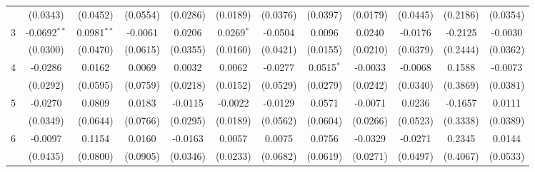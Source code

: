 \begin{adjustbox}{width=650}
\begin{tabular}{lccccccccccc}
                                            & (0.0343)        & (0.0452)             & (0.0554)                   & (0.0286)      & (0.0189)                      & (0.0376)                    & (0.0397)              & (0.0179)         & (0.0445)       & (0.2186)  & (0.0354)\\   
    3     & -0.0692$^{**}$  & 0.0981$^{**}$        & -0.0061                    & 0.0206        & 0.0269$^{*}$                  & -0.0504                     & 0.0096                & 0.0240           & -0.0176        & -0.2125   & -0.0030\\   
                                            & (0.0300)        & (0.0470)             & (0.0615)                   & (0.0355)      & (0.0160)                      & (0.0421)                    & (0.0155)              & (0.0210)         & (0.0379)       & (0.2444)  & (0.0362)\\   
    4     & -0.0286         & 0.0162               & 0.0069                     & 0.0032        & 0.0062                        & -0.0277                     & 0.0515$^{*}$          & -0.0033          & -0.0068        & 0.1588    & -0.0073\\   
                                            & (0.0292)        & (0.0595)             & (0.0759)                   & (0.0218)      & (0.0152)                      & (0.0529)                    & (0.0279)              & (0.0242)         & (0.0340)       & (0.3869)  & (0.0381)\\   
    5     & -0.0270         & 0.0809               & 0.0183                     & -0.0115       & -0.0022                       & -0.0129                     & 0.0571                & -0.0071          & 0.0236         & -0.1657   & 0.0111\\   
                                            & (0.0349)        & (0.0644)             & (0.0766)                   & (0.0295)      & (0.0189)                      & (0.0562)                    & (0.0604)              & (0.0266)         & (0.0523)       & (0.3338)  & (0.0389)\\   
    6     & -0.0097         & 0.1154               & 0.0160                     & -0.0163       & 0.0057                        & 0.0075                      & 0.0756                & -0.0329          & -0.0271        & 0.2345    & 0.0144\\   
                                            & (0.0435)        & (0.0800)             & (0.0905)                   & (0.0346)      & (0.0233)                      & (0.0682)                    & (0.0619)              & (0.0271)         & (0.0497)       & (0.4067)  & (0.0533)\\   

\end{tabular}
\end{adjustbox}
